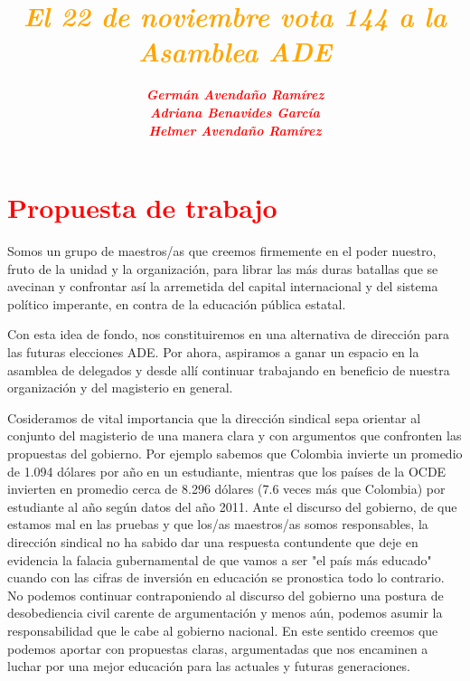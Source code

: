 \documentclass[10pt, notumble, letterpaper]{leaflet}
\title{\vspace*{3cm}\textcolor{orange}{\emph{\textbf{El 22 de noviembre vota 144 a la Asamblea ADE}}}}
\author{\textcolor{red}{\textbf{\textit{\Large{Germán Avendaño Ramírez}}}}\\\textcolor{red}{\Large{\textit{\textbf{Adriana Benavides García}}}}\\\textcolor{red}{\textit{\Large{\textbf{Helmer Avendaño Ramírez}}}}}
\date{}
\begin{document}
\maketitle

\thispagestyle{empty}
\section*{\textcolor{red}{Propuesta de trabajo}}
Somos un grupo de maestros/as que creemos firmemente en el poder nuestro, fruto de la unidad y la organización, para librar las más duras batallas que se avecinan y confrontar así la arremetida del capital internacional y del sistema político imperante, en contra de la educación pública estatal.

Con esta idea de fondo, nos constituiremos en una alternativa de dirección para las futuras elecciones ADE. Por ahora, aspiramos a ganar un espacio en la asamblea de delegados y desde allí continuar trabajando en beneficio de nuestra organización y del magisterio en general.

Cosideramos de vital importancia que la dirección sindical sepa orientar al conjunto del magisterio de una manera clara y con argumentos que confronten las propuestas del gobierno. Por ejemplo sabemos que Colombia invierte un promedio de 1.094 dólares por año en un estudiante, mientras que los países de la OCDE invierten en promedio cerca de 8.296 dólares (7.6 veces más que Colombia) por estudiante al año según datos del año 2011. Ante el discurso del gobierno, de que estamos mal en las pruebas y que los/as maestros/as somos responsables, la dirección sindical no ha sabido dar una respuesta contundente que deje en evidencia la falacia gubernamental de que vamos a ser "el país más educado" cuando con las cifras de inversión en educación se pronostica todo lo contrario. No podemos continuar contraponiendo al discurso del gobierno una postura de desobediencia civil carente de argumentación y menos aún, podemos asumir la responsabilidad que le cabe al gobierno nacional. En este sentido creemos que podemos aportar con propuestas claras, argumentadas que nos encaminen a luchar por una mejor educación para las actuales y futuras generaciones.
\end{document}

